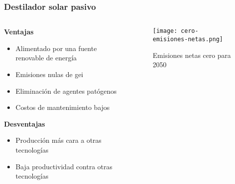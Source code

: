 \begin{frame}
    \frametitle{Destilador solar pasivo}
    \begin{columns}
        \begin{column}{0.5\textwidth}
            \textbf{\large Ventajas}
            
            \begin{itemize}
                \item Alimentado por una fuente renovable de energía
                \item Emisiones nulas de \acrfull{gei}
                \item Eliminación de agentes patógenos
                \item Costos de mantenimiento bajos
            \end{itemize}
            \vspace*{3mm}
            \textbf{\large Desventajas}
            
            \begin{itemize}
                \item Producción más cara a otras tecnologías
                \item Baja productividad contra otras tecnologías
            \end{itemize}
        \end{column}
        
        \begin{column}{0.5\textwidth}
            \centering
            \begin{figure}
                \centering
                \texttt{[image: cero-emisiones-netas.png]}
                \caption{Emisiones netas cero para 2050}
            \end{figure}
        \end{column}
    \end{columns}
\end{frame}

